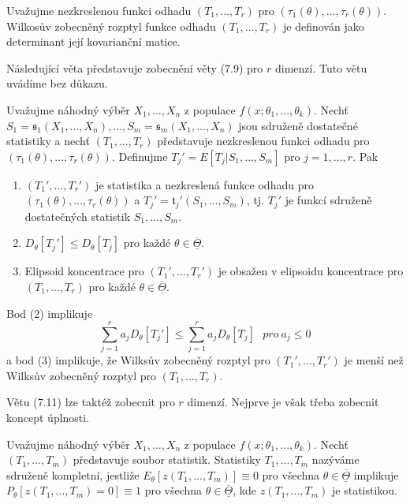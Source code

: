 \begin{definition}
Uvažujme nezkreslenou funkci odhadu $(T_1, ..., T_r)$ pro $(\tau_1(\theta), ..., \tau_r(\theta))$. Wilkosův zobecněný rozptyl funkce odhadu $(T_1, ..., T_r)$ je definován jako determinant její kovarianční matice.
\end{definition}

Následující věta představuje zobecnění věty (7.9) pro $r$ dimenzí. Tuto větu uvádíme bez důkazu.
\begin{theorem}
Uvažujme náhodný výběr $X_1, ..., X_n$ z populace $f(x; \theta_1, ..., \theta_k)$. Nechť $S_1 = \mathfrak{s}_1(X_1, ..., X_n), ..., S_m = \mathfrak{s}_m(X_1, ..., X_n)$ jsou sdruženě dostatečné statistiky a nechť $(T_1, ..., T_r)$ představuje nezkreslenou funkci odhadu pro $(\tau_1(\theta), ..., \tau_r(\theta))$. Definujme $T_j' = E[T_j|S_1, ..., S_m]$ pro $j = 1, ..., r$. Pak
\begin{enumerate}
\item $(T_1', ..., T_r')$ je statistika a nezkreslená funkce odhadu pro $(\tau_1(\theta), ..., \tau_r(\theta))$ a $T_j' = \mathfrak{t}_j'(S_1, ..., S_m)$, tj. $T_j'$ je funkcí sdruženě dostatečných statistik $S_1, ..., S_m$.
\item $D_{\theta}[T_j'] \le D_{\theta}[T_j]$ pro každé $\theta \in \overline{\underline{\Theta}}$.
\item Elipsoid koncentrace pro $(T_1', ..., T_r')$ je obsažen v elipsoidu koncentrace pro $(T_1, ..., T_r)$ pro každé $\theta \in \overline{\underline{\Theta}}$.
\end{enumerate}
\end{theorem}

Bod (2) implikuje
\begin{equation*}
\sum_{j = 1}^r a_j D_{\theta}[T_j'] \le \sum_{j = 1}^r a_j D_{\theta}[T_j] ~~~\textit{pro}~ a_j \le 0
\end{equation*}
a bod (3) implikuje, že Wilksův zobecněný rozptyl pro $(T_1', ..., T_r')$ je menší než Wilksův zobecněný rozptyl pro $(T_1, ..., T_r)$.

Větu (7.11) lze taktéž zobecnit pro $r$ dimenzí. Nejprve je však třeba zobecnit koncept úplnosti.

\begin{definition}
Uvažujme náhodný výběr $X_1, ..., X_n$ z populace $f(x; \theta_1, ..., \theta_k)$. Nechť $(T_1, ..., T_m)$ představuje soubor statistik. Statistiky $T_1, ..., T_m$ nazýváme sdruženě kompletní, jestliže $E_{\theta}[\mathit{z}(T_1, ..., T_m)] \equiv 0$ pro všechna $\theta \in \overline{\underline{\Theta}}$ implikuje $P_{\theta}[\mathit{z}(T_1, ..., T_m) = 0] \equiv 1$ pro všechna $\theta \in \overline{\underline{\Theta}}$, kde $\mathit{z}(T_1, ..., T_m)$ je statistikou.
\end{definition}


